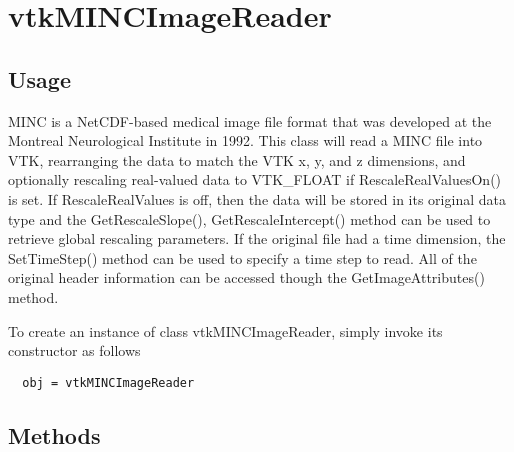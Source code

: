 \section{vtkMINCImageReader}

\subsection{Usage}

 MINC is a NetCDF-based medical image file format that was developed
 at the Montreal Neurological Institute in 1992. 
 This class will read a MINC file into VTK, rearranging the data to
 match the VTK x, y, and z dimensions, and optionally rescaling
 real-valued data to VTK\_FLOAT if RescaleRealValuesOn() is set.
 If RescaleRealValues is off, then the data will be stored in its
 original data type and the GetRescaleSlope(), GetRescaleIntercept()
 method can be used to retrieve global rescaling parameters.
 If the original file had a time dimension, the SetTimeStep() method
 can be used to specify a time step to read.
 All of the original header information can be accessed though the
 GetImageAttributes() method.

To create an instance of class vtkMINCImageReader, simply
invoke its constructor as follows
\begin{verbatim}
  obj = vtkMINCImageReader
\end{verbatim}
\subsection{Methods}


